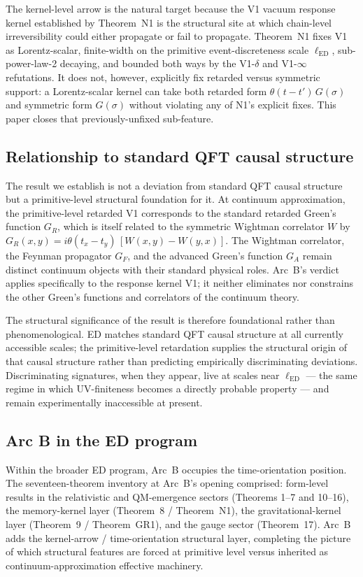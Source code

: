 \documentclass[11pt,a4paper]{article}
\begin{document}
The kernel-level arrow is the natural target because the V1 vacuum response kernel established by Theorem~N1 is the structural site at which chain-level irreversibility could either propagate or fail to propagate. Theorem~N1 fixes V1 as Lorentz-scalar, finite-width on the primitive event-discreteness scale $\ell_\mathrm{ED}$, sub-power-law-2 decaying, and bounded both ways by the V1-$\delta$ and V1-$\infty$ refutations. It does not, however, explicitly fix retarded versus symmetric support: a Lorentz-scalar kernel can take both retarded form $\theta(t-t')\,G(\sigma)$ and symmetric form $G(\sigma)$ without violating any of N1's explicit fixes. This paper closes that previously-unfixed sub-feature.

\subsection{Relationship to standard QFT causal structure}

The result we establish is not a deviation from standard QFT causal structure but a primitive-level structural foundation for it. At continuum approximation, the primitive-level retarded V1 corresponds to the standard retarded Green's function $G_R$, which is itself related to the symmetric Wightman correlator $W$ by $G_R(x,y) = i\theta(t_x - t_y)\,[W(x,y) - W(y,x)]$. The Wightman correlator, the Feynman propagator $G_F$, and the advanced Green's function $G_A$ remain distinct continuum objects with their standard physical roles. Arc~B's verdict applies specifically to the response kernel V1; it neither eliminates nor constrains the other Green's functions and correlators of the continuum theory.

The structural significance of the result is therefore foundational rather than phenomenological. ED matches standard QFT causal structure at all currently accessible scales; the primitive-level retardation supplies the structural origin of that causal structure rather than predicting empirically discriminating deviations. Discriminating signatures, when they appear, live at scales near $\ell_\mathrm{ED}$ --- the same regime in which UV-finiteness becomes a directly probable property --- and remain experimentally inaccessible at present.

\subsection{Arc B in the ED program}

Within the broader ED program, Arc~B occupies the time-orientation position. The seventeen-theorem inventory at Arc~B's opening comprised: form-level results in the relativistic and QM-emergence sectors (Theorems 1--7 and 10--16), the memory-kernel layer (Theorem~8 / Theorem~N1), the gravitational-kernel layer (Theorem~9 / Theorem~GR1), and the gauge sector (Theorem~17). Arc~B adds the kernel-arrow / time-orientation structural layer, completing the picture of which structural features are forced at primitive level versus inherited as continuum-approximation effective machinery.
\end{document}
